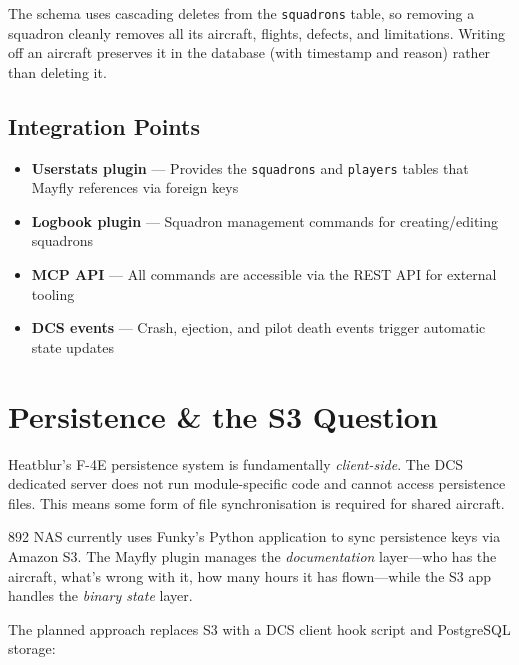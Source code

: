 \documentclass[10pt,a4paper,twocolumn]{article}
\begin{document}
The schema uses cascading deletes from the \texttt{squadrons} table, so removing a squadron cleanly removes all its aircraft, flights, defects, and limitations. Writing off an aircraft preserves it in the database (with timestamp and reason) rather than deleting it.

\subsection{Integration Points}

\begin{itemize}
    \item \textbf{Userstats plugin} --- Provides the \texttt{squadrons} and \texttt{players} tables that Mayfly references via foreign keys
    \item \textbf{Logbook plugin} --- Squadron management commands for creating/editing squadrons
    \item \textbf{MCP API} --- All commands are accessible via the REST API for external tooling
    \item \textbf{DCS events} --- Crash, ejection, and pilot death events trigger automatic state updates
\end{itemize}

\section{Persistence \& the S3 Question}

Heatblur's F-4E persistence system is fundamentally \emph{client-side}. The DCS dedicated server does not run module-specific code and cannot access persistence files. This means some form of file synchronisation is required for shared aircraft.

892 NAS currently uses Funky's Python application to sync persistence keys via Amazon S3. The Mayfly plugin manages the \emph{documentation} layer---who has the aircraft, what's wrong with it, how many hours it has flown---while the S3 app handles the \emph{binary state} layer.

The planned approach replaces S3 with a DCS client hook script and PostgreSQL storage:
\end{document}
